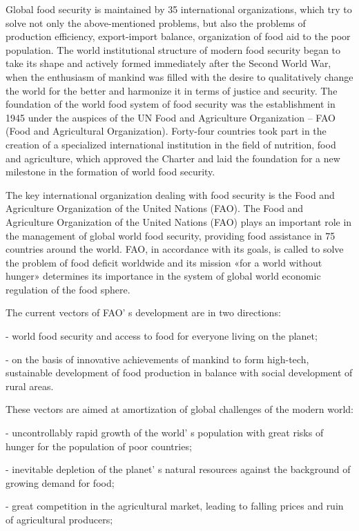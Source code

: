 {Global food security is maintained by 35 international organizations,
which try to solve not only the above-mentioned problems, but also the
problems of production efficiency, export-import balance, organization
of food aid to the poor population. The world institutional structure of
modern food security began to take its shape and actively formed
immediately after the Second World War, when the enthusiasm of mankind
was filled with the desire to qualitatively change the world for the
better and harmonize it in terms of justice and security. The foundation
of the world food system of food security was the establishment in 1945
under the auspices of the UN Food and Agriculture Organization -- FAO
(Food and Agricultural Organization). Forty-four countries took part in
the creation of a specialized international institution in the field of
nutrition, food and agriculture, which approved the Charter and laid the
foundation for a new milestone in the formation of world food security.

The key international organization dealing with food security is the
Food and Agriculture Organization of the United Nations (FAO). The Food
and Agriculture Organization of the United Nations (FAO) plays an
important role in the management of global world food security,
providing food assistance in 75 countries around the world. FAO, in
accordance with its goals, is called to solve the problem of food
deficit worldwide and its mission «for a world without hunger»
determines its importance in the system of global world economic
regulation of the food sphere.

The current vectors of FAO' s development are in two
directions:

- world food security and access to food for everyone living on the
planet;

- on the basis of innovative achievements of mankind to form high-tech,
sustainable development of food production in balance with social
development of rural areas.

These vectors are aimed at amortization of global challenges of the
modern world:

- uncontrollably rapid growth of the world' s population
with great risks of hunger for the population of poor countries;

- inevitable depletion of the planet' s natural resources
against the background of growing demand for food;

- great competition in the agricultural market, leading to falling
prices and ruin of agricultural producers;

}
